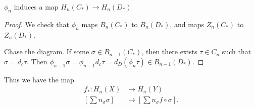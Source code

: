 \begin{claim}
	$\phi_n$ induces a map $H_n (C_*) \to H_n(D_*)$
\end{claim}
\begin{proof}
	We check that $\phi_n$ maps $B_n(C_*)$ to $B_n(D_*)$, and maps $Z_n(C_*) $ to $Z_n(D_*)$.

	Chase the diagram. If some $\sigma \in B_{n - 1}(C_*)$, then there exists $\tau \in C_n$ such that $\sigma = d_c \tau$. Then $\phi_{n - 1} \sigma = \phi_{n - 1} d_c \tau = d_D (\phi_n \tau) \in B_{n - 1}(D_*)$.
\end{proof}

Thus we have the map
\begin{align*}
	f_*: H_n(X) &\longrightarrow H_n(Y) \\
	\left[ \sum n_\sigma \sigma \right]  &\longmapsto \left[ \sum n_\sigma f \circ \sigma \right] 
.\end{align*}









